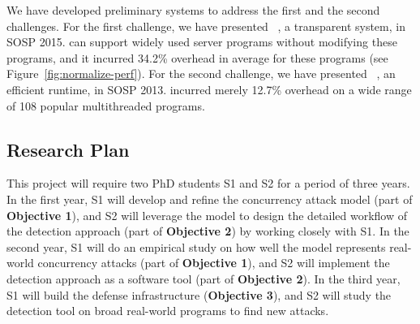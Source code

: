 




 We have developed preliminary systems to 
address the first and the second challenges. For the first challenge, we have 
presented \crane~\cite{crane:sosp15}, a transparent \smr system, in SOSP 2015. 
\crane can support widely used server programs without modifying these programs, 
and it incurred 34.2\% overhead in average for these programs (see 
Figure~\ref{fig:normalize-perf}). For the second challenge, we have presented 
\parrot~\cite{parrot:sosp13}, an efficient \dmt runtime, in SOSP 2013. \parrot 
incurred merely 12.7\% overhead on a wide range of 108 popular multithreaded 
programs.

\vspace{-.15in}\subsection{Research Plan} \label{sec:plan}\vspace{-.075in}

This project will require two PhD students S1 and S2 for a period of 
three years. In the first year, S1 will develop and refine the concurrency 
attack model (part of \textbf{Objective 1}), and S2 will leverage the model to 
design the detailed workflow of the detection approach (part of \textbf{Objective 2}) by working 
closely with S1. In the second year, S1 will do an empirical study on how well 
the model represents real-world concurrency attacks (part of \textbf{Objective 
1}), and S2 will implement the detection approach as a software tool (part of 
\textbf{Objective 2}). In the third year, S1 will build the defense 
infrastructure (\textbf{Objective 3}), and S2 will study the detection tool on 
broad real-world programs to find new attacks.


